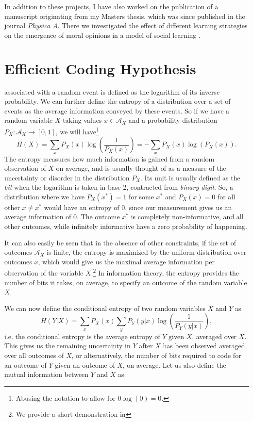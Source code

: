 In addition to these projects, I have also worked on the publication of a manuscript originating from my Masters thesis, which was since published in the journal 
\emph{Physica A}. There we investigated the effect of different learning strategies on the emergence of moral opinions in a model of social learning  
\citep{Vicente2014}.

\section{Efficient Coding Hypothesis}

 associated with a random event is defined as the logarithm of its inverse probability. We can further define the 
entropy of a distribution 
over a set of events as the average information conveyed by these events. So if we have a random variable $X$ taking values $x \in \mathcal{A}_X$ and a probability 
distribution $P_X : \mathcal{A}_X \to [0,1]$, we will have\footnote{Abusing the notation to allow for $0\log(0) = 0$.}
$$
H(X)= \sum_x P_X(x) \log\left(\frac{1}{P_X(x)}\right) = - \sum_x P_X(x) \log\left({P_X(x)}\right).
$$
The entropy measures how much information is gained from a random observation of $X$ on average, and is usually thought of as a measure of the uncertainty or 
disorder in the distribution $P_X$. Its unit is usually defined as the {\em bit} when the logarithm is taken in base 2, contracted from \emph{binary digit}. So, a distribution where 
we have $P_X(x^*) = 1$ for some $x^*$ and $P_X(x) = 0$ for all other $x\neq x^*$ would have an entropy of $0$, since our measurement gives us an average 
information of $0$. The outcome $x^*$ is completely non-informative, and all other outcomes, while infinitely informative have a zero probability of happening.\par
It can also easily be seen that in the absence of other constraints, if the set of outcomes $\mathcal{A}_X$ is finite, the entropy is maximized by the uniform 
distribution over outcomes $x$, which would give us the maximal average information per observation of the variable $X$.\footnote{We provide a short demonstration in 
} In information theory, the entropy provides the number of bits it takes, on average, to specify an outcome of the random variable $X$.\par
We can now define the conditional entropy of two random variables $X$ and $Y$ as
$$
H(Y|X) = \sum_x P_X(x) \sum_y P_Y(y|x) \log\left(\frac{1}{P_Y(y|x)}\right),
$$
i.e. the conditional entropy is the average entropy of $Y$ given $X$, averaged over $X$. This gives us the remaining uncertainty in $Y$ after $X$ has been observed averaged over all outcomes of $X$, or alternatively, the number of bits required to code for an outcome of $Y$ given an outcome of $X$, on average. Let us also define the mutual information between $Y$ and $X$ as

